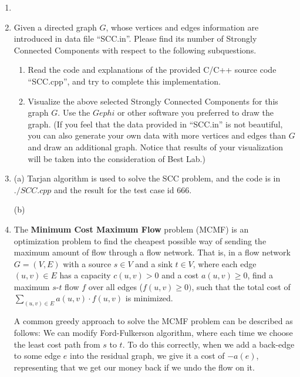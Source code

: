 \documentclass[12pt,a4paper]{article}
\makeatletter
\newtheorem*{solution}{Solution}
\theoremstyle{definition}
\renewenvironment{solution}[1][Solution] {\par\pushQED{\qed}\normalfont\topsep6\p@\@plus6\p@\relax\trivlist\item[\hskip\labelsep\bfseries#1\@addpunct{.}]\ignorespaces}{\popQED\endtrivlist\@endpefalse} \makeatother
\makeatother
\begin{document}
\begin{enumerate}
\begin{solution}
\begin{minipage}[t]{0.90\textwidth}
\begin{algorithm}[H]
{{					

				}
			}
		
			\;
			
		\end{algorithm}
	\end{minipage}
    \end{solution}

	\item Given a directed graph $G$, whose vertices and edges information are introduced in data file ``SCC.in''. Please find its number of Strongly Connected Components with respect to the following subquestions.
    \begin{enumerate}
    	\item Read the code and explanations of the provided C/C++ source code ``SCC.cpp'', and try to complete this implementation.
    	\item Visualize the above selected Strongly Connected Components for this graph $G$. Use the $Gephi$ or other software you preferred to draw the graph. {\color{blue}(If you feel that the data provided in ``SCC.in'' is not beautiful, you can also generate your own data with more vertices and edges than $G$ and draw an additional graph. Notice that results of your visualization will be taken into the consideration of Best Lab.)}

    \end{enumerate}
    \begin{solution}
		(a) Tarjan algorithm is used to solve the SCC problem, and the code is in $./SCC.cpp$ and the result for the test case id $666$.
		
		(b)
    \end{solution}
	\item The \textbf{Minimum Cost Maximum Flow} problem (MCMF) is an optimization problem to find the cheapest possible way of sending the maximum amount of flow through a flow network. That is, in a flow network $G = (V, E)$ with a source $s\in V$ and a sink $t\in V$, where each edge $(u, v)\in E$ has a capacity $c(u,v) > 0$ and a cost $a(u,v) \ge 0$, find a maximum $s\text{-}t$ flow $f$ over all edges ($f(u, v) \ge 0)$, such that the total cost of $\sum_{(u, v) \in E} a(u, v) \cdot f(u, v)$ is minimized.

A common greedy approach to solve the MCMF problem can be described as follows: We can modify Ford-Fulkerson algorithm, where each time we choose the least cost path from $s$ to $t$. To do this correctly, when we add a back-edge to some edge $e$ into the residual graph, we give it a cost of $-a(e)$, representing that we get our money back if we undo the flow on it.


\end{enumerate}
\end{document}
